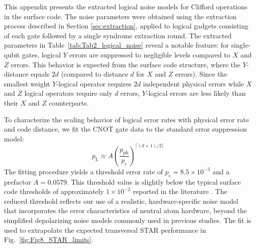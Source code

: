 \documentclass[aps, prx, reprint, superscriptaddress, longbibliography, floatfix]{revtex4-2}
\begin{document}
This appendix presents the extracted logical noise models for Clifford operations in the surface code. The noise parameters were obtained using the extraction process described in Section \ref{sec:extraction}, applied to logical gadgets consisting of each gate followed by a single syndrome extraction round. The extracted parameters in Table~\ref{tab:Tab2_logical_noise} reveal a notable feature: for single-qubit gates, logical $Y$ errors are suppressed to negligible levels compared to $X$ and $Z$ errors. This behavior is expected from the surface code structure, where the $Y$-distance equals $2d$ (compared to distance $d$ for $X$ and $Z$ errors). Since the smallest weight $Y$-logical operator requires $2d$ independent physical errors while $X$ and $Z$ logical operators require only $d$ errors, $Y$-logical errors are less likely than their $X$ and $Z$ counterparts.

To characterize the scaling behavior of logical error rates with physical error rate and code distance, we fit the CNOT gate data to the standard error suppression model:
\begin{equation}
p_{\text{L}} \approx A \left(\frac{p_{\text{ph}}}{p_{\text{c}}}\right)^{\lceil(d+1)/2 \rceil}
\end{equation}
The fitting procedure yields a threshold error rate of $p_{\text{c}} = 8.5 \times 10^{-3}$ and a prefactor $A = 0.0579$. This threshold value is slightly below the typical surface code thresholds of approximately $1 \times 10^{-2}$ reported in the literature \cite{Stephens2014}. The reduced threshold reflects our use of a realistic, hardware-specific noise model that incorporates the error characteristics of neutral atom hardware, beyond the simplified depolarizing noise models commonly used in previous studies. The fit is used to extrapolate the expected transversal STAR performance in Fig.~\ref{fig:Fig8_STAR_limits}.
\end{document}
